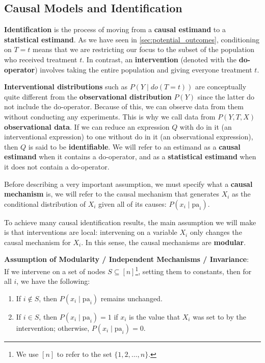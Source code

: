 \subsection{Causal Models and Identification}
\label{sec:causal_models}

\textbf{Identification} is the process of moving from a \textbf{causal estimand}
to a \textbf{statistical estimand}. As we have seen in \ref{sec:potential_outcomes},
conditioning on \( T = t \) means that we are restricting our focus to the subset
of the population who received treatment \( t \). In contrast, an \textbf{intervention}
(denoted with the \textbf{do-operator}) involves taking the entire population and
giving everyone treatment \( t \).

\textbf{Interventional distributions} such as \( P(Y \mid do(T = t)) \)
are conceptually quite different from the \textbf{observational distribution} \( P(Y) \)
since the latter do not include the do-operator.
Because of this, we can observe data from them without conducting any experiments.
This is why we call data from \( P(Y, T, X) \) \textbf{observational data}.
If we can reduce an expression \( Q \) with do in it (an interventional expression)
to one without do in it (an observational expression), then \( Q \) is said to be
\textbf{identifiable}. We will refer to an estimand as a
\textbf{causal estimand} when it contains a do-operator,
and as a \textbf{statistical estimand} when it does not contain a do-operator.

Before describing a very important assumption, we must specify what
a \textbf{causal mechanism} is,
we will refer to the causal mechanism that generates \( X_i \)
as the conditional distribution of \( X_i \) given all of
its causes: \( P(x_i \mid \text{pa}_i) \).

To achieve many causal identification results, the main assumption we will
make is that interventions are local:
intervening on a variable \( X_i \) only changes the causal mechanism for \( X_i \).
In this sense, the causal mechanisms are \textbf{modular}.

\textbf{Assumption of Modularity / Independent Mechanisms / Invariance}:\\
If we intervene on a set of nodes \( S \subseteq [n] \)\footnote{We use \( [n] \) to refer to the set \(\{1, 2, \ldots, n\}\).}, setting them to constants, then for all \( i \), we have the following:
\begin{enumerate}
    \item If \( i \notin S \), then \( P(x_i \mid \text{pa}_i) \) remains unchanged.
    \item If \( i \in S \), then \( P(x_i \mid \text{pa}_i) = 1 \) if \( x_i \)
    is the value that \( X_i \) was set to by the intervention; otherwise,
    \( P(x_i \mid \text{pa}_i) = 0 \).
\end{enumerate}

